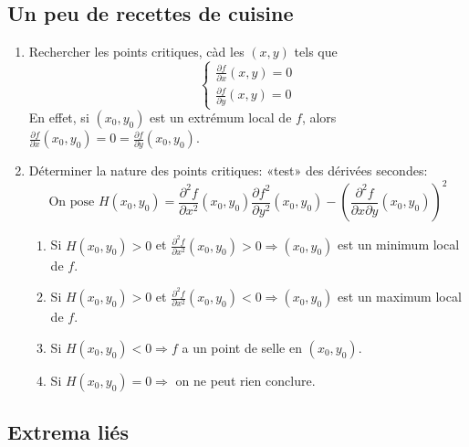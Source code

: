 \subsection{Un peu de recettes de cuisine}

\begin{enumerate}
\item Rechercher les points critiques, càd les $(x,y)$ tels que
\[\begin{cases} \frac{\partial f}{\partial x}(x,y) = 0 \\ \frac{\partial f}{\partial y}(x,y) = 0 \end{cases} \]
En effet, si $(x_0,y_0)$ est un extrémum local de $f$, alors $\frac{\partial f}{\partial x}(x_0,y_0) = 0 = \frac{\partial f}{\partial y}(x_0,y_0)$.
\item Déterminer la nature des points critiques: «test» des dérivées secondes:
\[\text{On pose }H(x_0,y_0) = \frac{\partial^2 f}{\partial x^2}(x_0,y_0)\frac{\partial f^2}{\partial y^2}(x_0,y_0) - \left(\frac{\partial^2 f}{\partial x\partial y}(x_0,y_0)\right)^2\]
\begin{enumerate}
\item Si $H(x_0,y_0) > 0$ et $\frac{\partial^2 f}{\partial x^2}(x_0,y_0) > 0 \Longrightarrow (x_0,y_0)$ est un minimum local de $f$.
\item Si $H(x_0,y_0) > 0$ et $\frac{\partial^2 f}{\partial x^2}(x_0,y_0) < 0 \Longrightarrow (x_0,y_0)$ est un maximum local de $f$.
\item Si $H(x_0,y_0) < 0 \Longrightarrow f$ a un point de selle en $(x_0,y_0)$.
\item Si $H(x_0,y_0) = 0 \Longrightarrow$ on ne peut rien conclure.
\end{enumerate}
\end{enumerate}

\subsection{Extrema liés}


